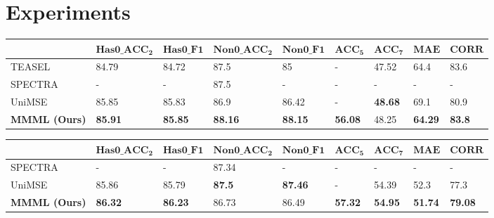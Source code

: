 \documentclass[11pt]{article}
\begin{document}
\section{Experiments}
\begin{table*}
\centering
\begin{subtable}{\textwidth}
\centering
\small
\setlength{\tabcolsep}{3pt}
\renewcommand{\arraystretch}{1.2}
\begin{tabular}{lllllllll}
\hline 
 & $\mathbf{Has0\_ACC_2}$ & $\mathbf{Has0\_F1}$ & $\mathbf{Non0\_ACC_2}$ & $\mathbf{Non0\_F1}$ & $\mathbf{ACC_5}$ & $\mathbf{ACC_7}$ & $\mathbf{MAE}$ & $\mathbf{CORR}$ \\ \hline
TEASEL & 84.79 & 84.72 & 87.5 & 85 & - & 47.52 & 64.4 & 83.6 \\ 
SPECTRA & - & - & 87.5 & - & - & - & - & - \\ 
UniMSE & 85.85 & 85.83 & 86.9 & 86.42 & - & \textbf{48.68} & 69.1 & 80.9 \\ \hline
\textbf{MMML (Ours)} & \textbf{85.91} & \textbf{85.85} & \textbf{88.16} & \textbf{88.15} & \textbf{56.08} & 48.25 & \textbf{64.29} & \textbf{83.8} \\ \hline
\end{tabular}
\caption{CMU-MOSI}
\label{tab:CMU-MOSI1}
\end{subtable}
\vspace{0.3cm}
\begin{subtable}{\textwidth}
\centering
\small
\setlength{\tabcolsep}{3pt}
\renewcommand{\arraystretch}{1.2}
\begin{tabular}{lllllllll}
\hline
 & $\mathbf{Has0\_ACC_2}$ & $\mathbf{Has0\_F1}$ & $\mathbf{Non0\_ACC_2}$ & $\mathbf{Non0\_F1}$ & $\mathbf{ACC_5}$ & $\mathbf{ACC_7}$ & $\mathbf{MAE}$ & $\mathbf{CORR}$ \\ \hline
SPECTRA & - & - & 87.34 & - & - & - & - & - \\ 
UniMSE & 85.86 & 85.79 & \textbf{87.5} & \textbf{87.46} & - & 54.39 & 52.3 & 77.3 \\ \hline
\textbf{MMML (Ours)} & \textbf{86.32} & \textbf{86.23} & 86.73 & 86.49 & \textbf{57.32} & \textbf{54.95} & \textbf{51.74} & \textbf{79.08} \\ \hline
\end{tabular}
\caption{CMU-MOSEI}
\label{tab:CMU-MOSEI1}
\end{subtable}
\vspace{0.3cm}
\begin{subtable}{\textwidth}

\end{subtable}
\end{table*}
\end{document}
